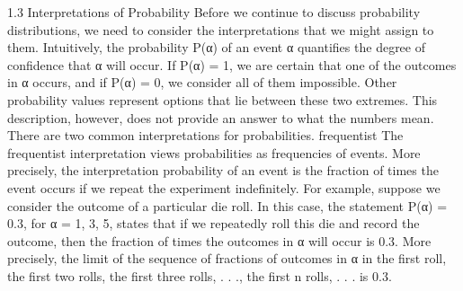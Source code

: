1.3 Interpretations of Probability
Before we continue to discuss probability distributions, we need to consider the interpretations that we might assign to them. Intuitively, the probability P(α) of an event α quantifies the degree of confidence that α will occur. If P(α) = 1, we are certain that one of the outcomes in α occurs, and if P(α) = 0, we consider all of them impossible. Other probability values represent options that lie between these two extremes. This description, however, does not provide an answer to what the numbers mean. There are two common interpretations for probabilities. frequentist The frequentist interpretation views probabilities as frequencies of events. More precisely, the interpretation probability of an event is the fraction of times the event occurs if we repeat the experiment indefinitely. For example, suppose we consider the outcome of a particular die roll. In this case, the statement P(α) = 0.3, for α = {1, 3, 5}, states that if we repeatedly roll this die and record the outcome, then the fraction of times the outcomes in α will occur is 0.3. More precisely, the limit of the sequence of fractions of outcomes in α in the first roll, the first two rolls, the first three rolls, . . ., the first n rolls, . . . is 0.3.

